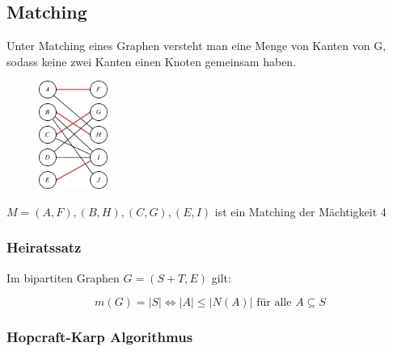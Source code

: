 \subsection{Matching}

Unter Matching eines Graphen versteht man eine Menge von Kanten von G, sodass keine zwei Kanten einen Knoten gemeinsam haben.

\begin{figure}[h]
\centering
\includegraphics[width=0.2\textwidth]{graphics/graph_matching.png}
\end{figure}

$M = {(A,F), (B,H), (C,G), (E,I)}$ ist ein Matching der Mächtigkeit 4

\subsubsection*{Heiratssatz}

Im bipartiten Graphen $G = (S + T, E)$ gilt:

$$
m(G) = |S| \Leftrightarrow |A| \leq |N (A)| \text{ für alle } A \subseteq S
$$

\subsubsection*{Hopcraft-Karp Algorithmus}

